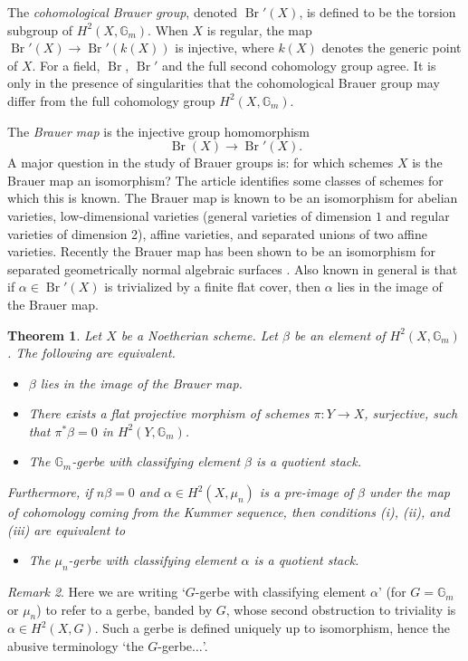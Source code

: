\documentclass[12pt]{amsart}
\newcommand{\G}{{\mathbb G}}
\DeclareMathOperator{\Br}{Br}
\theoremstyle{plain}
\newtheorem  {thm}        {Theorem}     [section]
\theoremstyle{definition}
\theoremstyle{remark}
\newtheorem {remark} [thm]  {Remark}
\begin{document}
The {\it cohomological Brauer group}, denoted $\Br'(X)$, is defined to be
the torsion subgroup of $H^2(X,\G_m)$.
When $X$ is regular, the map $\Br'(X)\to \Br'(k(X))$ is injective,
where $k(X)$ denotes the generic point of $X$.
For a field,  $\Br$, $\Br'$ and the full second cohomology group
agree.
It is only in the presence of singularities that the cohomological
Brauer group may differ from the full cohomology group $H^2(X,\G_m)$.

The {\it Brauer map} is the injective group homomorphism
$$\Br(X)\to \Br'(X).$$
A major question in the study of Brauer groups is:
for which schemes $X$ is the Brauer map an isomorphism?
The article \cite{Ho} identifies some classes of schemes
for which this is known.
The Brauer map
is known to be an isomorphism for abelian varieties, low-dimensional
varieties (general varieties of dimension $1$ and regular varieties of
dimension 2), affine varieties, and separated unions of two affine
varieties.
Recently the Brauer map has been shown to be an isomorphism for
separated geometrically normal algebraic surfaces \cite{schr}.
Also known in general is that if $\alpha\in \Br'(X)$ is trivialized by a
finite flat cover, then $\alpha$ lies in the image of the Brauer map.

\begin{thm} \label{t.brauer}
Let $X$ be a Noetherian scheme.
Let $\beta$ be an element of $H^2(X,\G_m)$.
The following are equivalent.
\begin{itemize}
\item[(i)] $\beta$ lies in the image of the Brauer map.
\item[(ii)] There exists a flat projective morphism of schemes
$\pi\colon Y\to X$,
surjective, such that $\pi^*\beta=0$ in $H^2(Y,\G_m)$.
\item[(iii)] The $\G_m$-gerbe with classifying element $\beta$
is a quotient stack.
\end{itemize}
Furthermore, if $n\beta=0$ and $\alpha\in H^2(X,\mu_n)$ is a pre-image
of $\beta$ under the map of cohomology coming from the Kummer sequence,
then conditions {\em (i)}, {\em (ii)}, and {\em (iii)} are equivalent to
\begin{itemize}
\item[(iv)] The $\mu_n$-gerbe with classifying element $\alpha$
is a quotient stack.
\end{itemize}
\end{thm}

\begin{remark}
Here we are writing `$G$-gerbe with classifying element $\alpha$'
(for $G=\G_m$ or $\mu_n$) to refer to a gerbe, banded by $G$, whose
second obstruction to triviality is $\alpha\in H^2(X,G)$.
Such a gerbe is defined uniquely up to isomorphism, hence the
abusive terminology `the $G$-gerbe$\ldots$'.
\end{remark}
\end{document}
